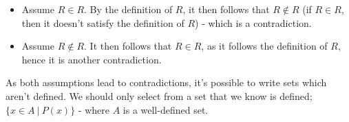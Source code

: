 \documentclass[a4paper, 12pt]{article}
\begin{document}
        \begin{itemize}
            \item Assume $R \in R$. By the definition of $R$, it then follows that $R \notin R$ (if $R \in R$, then it doesn't satisfy the definition of $R$) - which is a contradiction.
            \item Assume $R \notin R$. It then follows that $R \in R$, as it follows the definition of $R$, hence it is another contradiction.
        \end{itemize}

        As both assumptions lead to contradictions, it's possible to write sets which aren't defined. We should only select from a set that we know is defined; $\{x \in A\ |\ P(x)\}$ - where $A$ is a well-defined set.
    
\end{document}
